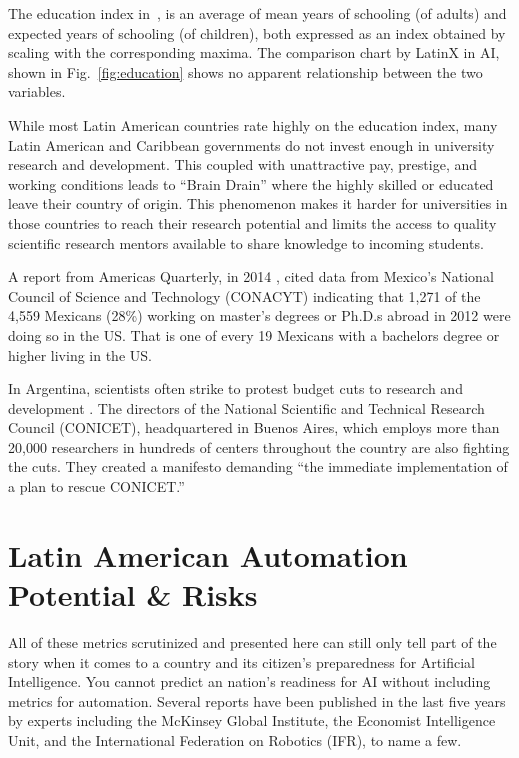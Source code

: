\documentclass[conference]{IEEEtran}
\begin{document}
The education index in~\cite{undp2018education}, is an average of mean years of schooling (of adults) and expected years of schooling (of children), both expressed as an index obtained by scaling with the corresponding maxima. The comparison chart by LatinX in AI\texttrademark, shown in Fig.~\ref{fig:education} shows no apparent relationship between the two variables. 

While most Latin American countries rate highly on the education index, many Latin American and Caribbean governments do not invest enough in university research and development. This coupled with unattractive pay, prestige, and working conditions leads to ``Brain Drain'' where the highly skilled or educated leave their country of origin. This phenomenon makes it harder for universities in those countries to reach their research potential and limits the access to quality scientific research mentors available to share knowledge to incoming students.

A report from Americas Quarterly, in 2014 \cite{velasco2014academic}, cited data from Mexico's National Council of Science and Technology (CONACYT) indicating that 1,271 of the 4,559 Mexicans (28\%) working on master's degrees or Ph.D.s abroad in 2012 were doing so in the US. That is one of every 19 Mexicans with a bachelors degree or higher living in the US.

In Argentina, scientists often strike to protest budget cuts to research and development \cite{debat2019plan}. The directors of the National Scientific and Technical Research Council (CONICET), headquartered in Buenos Aires, which employs more than 20,000 researchers in hundreds of centers throughout the country are also fighting the cuts. They created a manifesto demanding ``the immediate implementation of a plan to rescue CONICET.''


\section{Latin American Automation Potential \& Risks}

All of these metrics scrutinized and presented here can still only tell part of the story when it comes to a country and its citizen's preparedness for Artificial Intelligence. You cannot predict an nation's readiness for AI without including metrics for automation. Several reports have been published in the last five years by experts including the McKinsey Global Institute, the Economist Intelligence Unit, and the International Federation on Robotics (IFR), to name a few.
\end{document}
